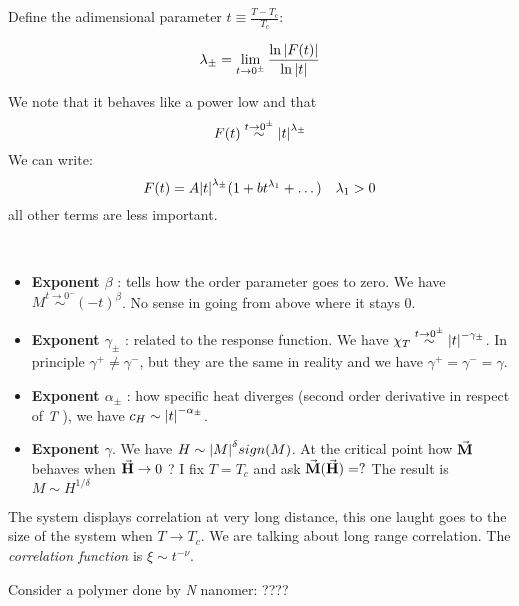 \documentclass[../main/main.tex]{subfiles}
\begin{document}
Define the adimensional parameter \( t \equiv \frac{T-T_c}{T_c} \): \begin{definition}
\begin{equation}
  \lambda _{\pm} = \lim_{t \rightarrow 0^{\pm}} \frac{\ln{\abs{F(t)} } }{\ln{\abs{t} } }
  \label{eq:}
\end{equation}
\end{definition}
We note that it behaves like a power low and that
\begin{equation}
  F(t) \overset{t \rightarrow  0^{\pm}}{\sim } \abs{t}^{\lambda _{\pm}}
  \label{eq:}
\end{equation}
We can write:
\begin{equation}
  F(t) = A \abs{t}^{\lambda _{\pm}} ( 1 + bt^{\lambda _1}+ \dots) \quad \lambda _1 > 0
  \label{eq:}
\end{equation}
all other terms are less important.
\begin{definition}[Exponent]\
\begin{itemize}
\item \textbf{Exponent \( \beta \) }: tells how the order parameter goes to zero.
We have \( M \overset{t \rightarrow  0^-}{\sim} (-t)^{\beta }  \). No sense in going from above where it stays 0.
\item \textbf{Exponent \( \gamma _{\pm}  \) }: related to the response function. We have \( \chi _T \overset{t \rightarrow 0^{\pm}}{\sim} \abs{t}^{-\gamma _{\pm} }   \). In principle \( \gamma ^+ \neq \gamma ^-  \), but they are the same in reality and we have \( \gamma ^+ = \gamma ^- = \gamma     \).
\item \textbf{Exponent \( \alpha _{\pm} \) }: how specific heat diverges (second order derivative in respect of \emph{T} ), we have \( c_H \sim \abs{t}^{-\alpha _{\pm}}  \).
\item \textbf{Exponent \( \gamma   \)}. We have \( H \sim \abs{M}^{\delta } sign(M)  \). At the critical point how \( \va{M}  \) behaves when \( \va{H} \rightarrow 0  \) ? I fix \( T=T_c \) and ask \( \va{M}(\va{H} ) = ?  \)  The result is \( M \sim H^{1/\delta } \)
\end{itemize}
\end{definition}


The system displays correlation at very long distance, this one laught goes to the size of the system when \( T \rightarrow T_c \). We are talking about long range correlation. The \emph{correlation function} is \( \xi \sim t^{-\nu } \).
\begin{example}
Consider a polymer done by \emph{N} nanomer:
????


\end{example}
\end{document}
